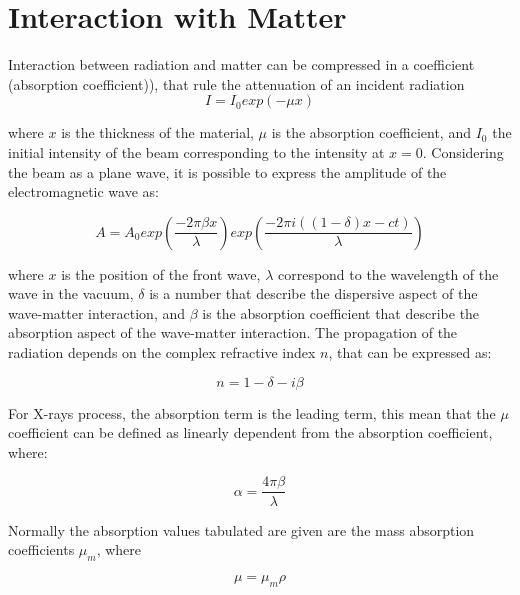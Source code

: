 \section{Interaction with Matter}
\label{sec: Interaction with Matter}
Interaction between radiation and matter can be compressed in a coefficient (absorption coefficient)), that rule the attenuation of an incident radiation
\begin{equation}
I = I_0 exp(-\mu x)
\label{eq: intensity}
\end{equation}
\begin{flushleft}
where $x $ is the thickness of the material, $\mu$ is the absorption coefficient, and $I_0$ the initial intensity of the beam corresponding to the intensity at $x=0$. Considering the beam as a plane wave, it is possible to express the  amplitude of the electromagnetic wave as:
\end{flushleft}
\begin{equation}
A=A_0exp(\frac{-2 \pi \beta x}{\lambda})exp(\frac{-2 \pi i ((1 - \delta)x-ct)}{\lambda})
\label{eq: amplitude}
\end{equation}
\begin{flushleft}
where $x$ is the position of the front wave, $\lambda$ correspond to the wavelength of the wave in the vacuum, $\delta $ is a number that describe the dispersive aspect of the wave-matter interaction, and $\beta $ is the absorption coefficient that describe the absorption aspect of the wave-matter interaction. The propagation of the radiation depends on the complex refractive index $n $, that can be expressed as: 
\end{flushleft}
\begin{equation}
n = 1 - \delta - i \beta
\label{eq: n_comlex}
\end{equation}
\begin{flushleft}
For X-rays process, the absorption term is the leading term, this mean that the $\mu$ coefficient can be defined as linearly dependent from the absorption coefficient, where:
\end{flushleft}
\begin{equation}
\alpha = \frac{4 \pi \beta}{\lambda}
\label{eq: alpha1}
\end{equation}
\begin{flushleft}
Normally the absorption values tabulated are given are the mass absorption coefficients $\mu_m$, where
\end{flushleft}
\begin{equation}
\mu = \mu_m \rho
\label{eq: alpha2}
\end{equation}
